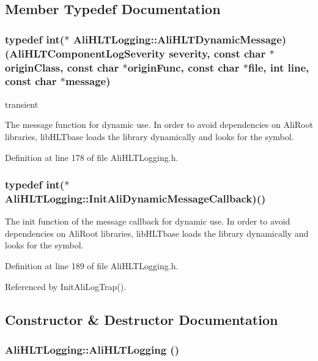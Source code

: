 \subsection{Member Typedef Documentation}
\subsubsection{\setlength{\rightskip}{0pt plus 5cm}typedef int($\ast$ {\bf Ali\-HLTLogging::Ali\-HLTDynamic\-Message})({\bf Ali\-HLTComponent\-Log\-Severity} severity, const char $\ast$origin\-Class, const char $\ast$origin\-Func, const char $\ast$file, int line, const char $\ast$message)}\label{classAliHLTLogging_w0}


transient 

The message function for dynamic use. In order to avoid dependencies on Ali\-Root libraries, lib\-HLTbase loads the library dynamically and looks for the symbol. 

Definition at line 178 of file Ali\-HLTLogging.h.
\subsubsection{\setlength{\rightskip}{0pt plus 5cm}typedef int($\ast$ {\bf Ali\-HLTLogging::Init\-Ali\-Dynamic\-Message\-Callback})()}\label{classAliHLTLogging_w1}


The init function of the message callback for dynamic use. In order to avoid dependencies on Ali\-Root libraries, lib\-HLTbase loads the library dynamically and looks for the symbol. 

Definition at line 189 of file Ali\-HLTLogging.h.

Referenced by Init\-Ali\-Log\-Trap().

\subsection{Constructor \& Destructor Documentation}
\subsubsection{\setlength{\rightskip}{0pt plus 5cm}Ali\-HLTLogging::Ali\-HLTLogging ()}\label{classAliHLTLogging_a0}




